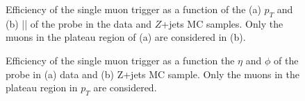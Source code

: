 \begin{figure}[!htb]
    \centering
    \caption{Efficiency of the single muon trigger as a function of the (a) $p_{T}$ and (b) |\zzero| of the probe in the data and $Z$+jets MC samples. Only the muons in the plateau region of (a) are considered in (b).}
    \label{fig:MuonTrigEff1D}
\end{figure}


\begin{figure}[!htb]
    \centering
    \caption{Efficiency of the single muon trigger as a function the $\eta$ and $\phi$ of the probe in (a) data and (b) Z+jets MC sample. Only the muons in the plateau region in $p_{T}$ are considered.}
    \label{fig:MuonTrigEff2D}
\end{figure}





